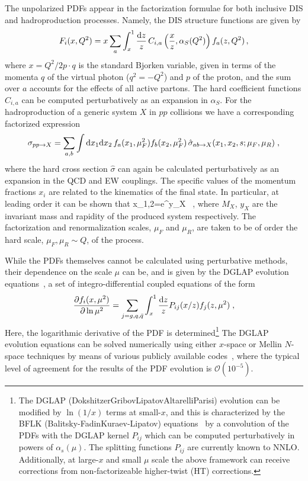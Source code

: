 The unpolarized PDFs appear in the factorization formulae for both inclusive DIS and hadroproduction processes. Namely, the DIS structure functions are given by
\begin{equation}
F_i(x,Q^2)=x\sum_a \int_x^1 \frac{{\rm d}z}{z}\,C_{i,a}\left(\frac{x}{z},\alpha_S(Q^2)\right)f_a(z,Q^2)\, ,
\end{equation}
where $x=Q^2/2p\cdot q$ is the standard Bjorken variable, given in terms of the momenta $q$ of the virtual photon ($q^2=-Q^2$) and $p$ of the proton,
and the sum over $a$ accounts for the effects of all active partons.
%
The hard coefficient functions $C_{i,a}$ can be computed perturbatively as an expansion in $\alpha_S$.
%
For the hadroproduction of a generic system $X$ in $pp$ collisions we have
a corresponding factorized expression
\begin{equation}
  \label{eq:LHCxsec}
\sigma_{pp\to X}=\sum_{a,b}\int {\rm d}x_1 {\rm d}x_2\, f_a(x_1,\mu_F^2)f_b(x_2,\mu_F^2)\,\hat{\sigma}_{ab\to X}(x_1,x_2,s;\mu_{F},\mu_R)\;,
\end{equation}
where the hard cross section $\hat{\sigma}$ can again be calculated perturbatively as an expansion in the QCD and EW couplings.
%
The specific values of the momentum fractions
$x_i$ are related to the kinematics of the final state.
%
In particular, at leading order it can be shown that
\be
x_{1,2}=e^{\pm y_X} \, ,
\ee
where $M_X$, $y_X$ are the invariant mass and rapidity of the produced system respectively.
%
The factorization and renormalization scales, $\mu_F$ and $\mu_R$, are taken to be of order the hard scale, $\mu_F,\mu_R
\sim Q$, of the process.

While the PDFs themselves cannot be calculated using perturbative methods, their dependence on the scale $\mu$ can be, and is given by the  
DGLAP evolution equations~\cite{Dokshitzer:1977sg,Gribov:1972ri,Altarelli:1977zs},
a set of integro-differential coupled equations of the form
\begin{equation}
  \label{eq:dglap}
\frac{\partial f_i(x,\mu^2)}{\partial \ln \mu^2}=\sum_{j=g,q,\bar{q}}\int_x^1 \frac{{\rm d}z}{z}P_{ij}(x/z)f_j(z,\mu^2)\;,
\end{equation}
Here, the logarithmic derivative of the PDF is
determined\footnote{The DGLAP (Dokshitzer\textendash Gribov\textendash Lipatov\textendash Altarelli\textendash Parisi)
evolution can be modified by $\ln(1/x)$ terms at small-$x$, and
this is characterized by the BFLK (Balitsky-FadinKuraev-Lipatov) equations~\cite{Kuraev:1976ge,Kuraev:1977fs,Balitsky:1978ic} by a convolution
of the PDFs with the DGLAP kernel $P_{ij}$ which can be computed
perturbatively in powers of $\alpha_{s}(\mu)$.
%
The splitting functions $P_{ij}$ are currently known to NNLO.
%
Additionally, at large-$x$ and small $\mu$ scale the above framework
can receive corrections from non-factorizeable higher-twist (HT) corrections.}
%
The DGLAP evolution equations can be solved numerically using
either $x$-space or Mellin $N$-space techniques by means of various
publicly available
codes~\cite{Bertone:2013vaa,Salam:2008qg,Botje:2010ay}, where the typical level of agreement
for the results of the PDF evolution is $\mathcal{O}(10^{-5})$.

